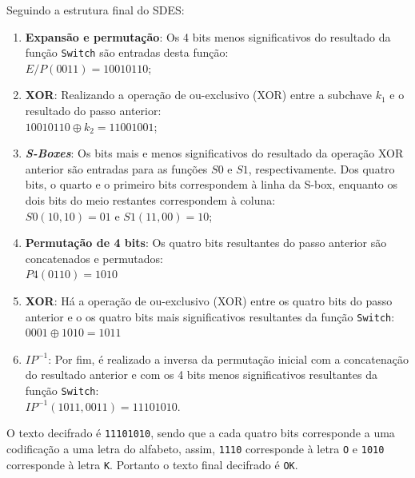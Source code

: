 \documentclass{article}
\begin{document}
\begin{enumerate}
    Seguindo a estrutura final do SDES:
    \begin{enumerate}
        \item \textbf{Expansão e permutação}: Os 4 bits menos significativos do
            resultado da função \texttt{Switch} são entradas desta função: \\
        $E/P(0011) = 10010110$;
        \item \textbf{XOR}: Realizando a operação de ou-exclusivo (XOR) entre a
            subchave $k_{1}$ e o resultado do passo anterior: \\
        $10010110 \oplus k_{2} = 11001001$;
        \item \textbf{\textit{S-Boxes}}: Os bits mais e menos significativos do
            resultado da operação XOR anterior são entradas para as funções
            $S0$ e $S1$, respectivamente. Dos quatro bits, o quarto e o
            primeiro bits correspondem à linha da S-box, enquanto os dois bits
            do meio restantes correspondem à coluna: \\
        $S0(10, 10) = 01$ e $S1(11, 00) = 10$;
        \item \textbf{Permutação de 4 bits}: Os quatro bits resultantes do
            passo anterior são concatenados e permutados: \\
        $P4(0110) = 1010$
        \item \textbf{XOR}: Há a operação de ou-exclusivo (XOR) entre os quatro
            bits do passo anterior e o os quatro bits mais significativos
            resultantes da função \texttt{Switch}: \\
        $0001 \oplus 1010 = 1011$
        \item \textbf{$IP^{-1}$}: Por fim, é realizado a inversa da permutação
            inicial com a concatenação do resultado anterior e com os 4 bits
            menos significativos resultantes da função \texttt{Switch}: \\
        $IP^{-1}(1011,0011) = 11101010$.
    \end{enumerate}
    O texto decifrado é \texttt{11101010}, sendo que a cada quatro bits
    corresponde a uma codificação a uma letra do alfabeto, assim, \texttt{1110}
    corresponde à letra \texttt{O} e \texttt{1010} corresponde à letra
    \texttt{K}. Portanto o texto final decifrado é \texttt{OK}. 
\end{enumerate}



\end{document}
